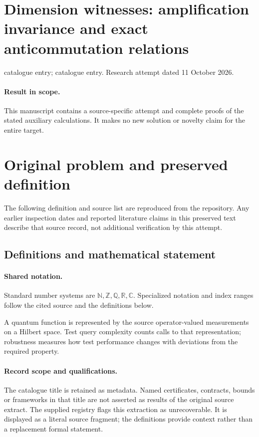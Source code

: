\documentclass[11pt]{article}
\begin{document}
\section*{Dimension witnesses: amplification invariance and exact anticommutation relations}
\noindent catalogue entry; catalogue entry. Research attempt dated 11 October 2026.
\paragraph{Result in scope.}This manuscript contains a source-specific attempt and complete proofs of the stated auxiliary calculations. It makes no new solution or novelty claim for the entire target.
\section{Original problem and preserved definition}
The following definition and source list are reproduced from the repository. Any earlier inspection dates and reported literature claims in this preserved text describe that source record, not additional verification by this attempt.
\subsection{Definitions and mathematical statement}

\paragraph{Shared notation.}Standard number systems are $\mathbb N,\mathbb Z,\mathbb Q,\mathbb R,\mathbb C$. Specialized notation and index ranges follow the cited source and the definitions below.


A quantum function is represented by the source operator-valued measurements on a Hilbert space. Test query complexity counts calls to that representation; robustness measures how test performance changes with deviations from the required property.
\paragraph{Record scope and qualifications.}
The catalogue title is retained as metadata. Named certificates, contracts, bounds or frameworks in that title are not asserted as results of the original source extract.
The supplied registry flags this extraction as unrecoverable. It is displayed as a literal source fragment; the definitions provide context rather than a replacement formal statement.
\end{document}
